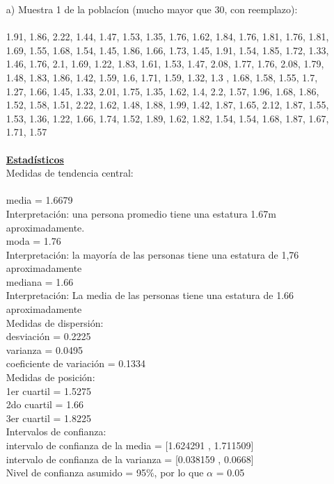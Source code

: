 \documentclass[a4paper,12pt]{article}
\begin{document}
\begin{enumerate}
    \item[a)] Muestra 1 de la poblac\'ion (mucho mayor que 30, con reemplazo): \\\\
1.91, 1.86, 2.22, 1.44,	1.47, 1.53,
1.35,	1.76,	1.62,	1.84,   1.76,	1.81,
1.76,	1.81,	1.69,	1.55,   1.68,	1.54,
1.45,	1.86,	1.66,	1.73,   1.45,	1.91,
1.54,	1.85,	1.72,	1.33,   1.46,	1.76,
2.1,    1.69,	1.22,	1.83,   1.61,	1.53,
1.47,	2.08,	1.77,	1.76,   2.08,	1.79,
1.48,	1.83,	1.86,	1.42,   1.59,	1.6,
1.71,	1.59,	1.32,	1.3	,   1.68,	1.58,
1.55,	1.7,    1.27,	1.66,   1.45,	1.33,
2.01,	1.75,	1.35,	1.62,   1.4,    2.2,
1.57,	1.96,	1.68,	1.86,   1.52,	1.58,
1.51,	2.22,	1.62,	1.48,   1.88,	1.99,
1.42,	1.87,	1.65,	2.12,   1.87,	1.55,
1.53,	1.36,	1.22,	1.66,   1.74,	1.52,
1.89,	1.62,	1.82,	1.54,   1.54,	1.68,
1.87,	1.67,	1.71,	1.57\\\\

\newpage
\textbf{\underline{Estad\'isticos}} \\

Medidas de tendencia central:\\\\
media = 1.6679\\
Interpretaci\'on: una persona promedio tiene una estatura 1.67m aproximadamente.\\
moda = 1.76\\
Interpretaci\'on: la mayor\'ia de las personas tiene una estatura de 1,76 aproximadamente\\
mediana = 1.66\\
Interpretación: La media de las personas tiene una estatura de 1.66 aproximadamente\\

Medidas de dispersi\'on:\\
desviaci\'on = 0.2225\\
varianza = 0.0495\\
coeficiente de variaci\'on = 0.1334\\

Medidas de posici\'on:\\
1er cuartil = 1.5275\\
2do cuartil = 1.66\\
3er cuartil = 1.8225\\

Intervalos de confianza:\\
intervalo de confianza de la media = [1.624291 ,  1.711509]\\
intervalo de confianza de la varianza = [0.038159 ,  0.0668]\\
Nivel de confianza asumido = 95$\%$, por lo que $\alpha$ = 0.05\\\\


\end{enumerate}
\end{document}
